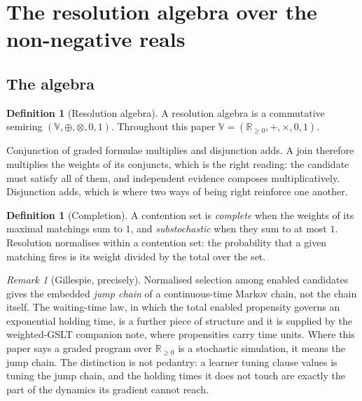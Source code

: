 \documentclass[11pt,a4paper]{article}
\theoremstyle{plain}
\theoremstyle{definition}
\newtheorem{definition}[theorem]{Definition}
\theoremstyle{remark}
\newtheorem{remark}[theorem]{Remark}
\newcommand{\V}{\mathbb{V}}
\newcommand{\Rnn}{\mathbb{R}_{\geq 0}}
\newcommand{\tensorv}{\otimes}
\newcommand{\sumv}{\oplus}
\begin{document}
\section{The resolution algebra over the non-negative reals}\label{sec:algebra}

\subsection{The algebra}

\begin{definition}[Resolution algebra]\label{def:alg}
A resolution algebra is a commutative semiring
$(\V, \sumv, \tensorv, 0, 1)$. Throughout this paper
$\V = (\Rnn, +, \times, 0, 1)$.
\end{definition}

Conjunction of graded formulae multiplies and disjunction adds. A join therefore
multiplies the weights of its conjuncts, which is the right reading: the
candidate must satisfy all of them, and independent evidence composes
multiplicatively. Disjunction adds, which is where two ways of being right
reinforce one another.

\begin{definition}[Completion]\label{def:completion}
A contention set is \emph{complete} when the weights of its maximal matchings sum
to $1$, and \emph{substochastic} when they sum to at most $1$. Resolution
normalises within a contention set: the probability that a given matching fires is
its weight divided by the total over the set.
\end{definition}

\begin{remark}[Gillespie, precisely]\label{rem:gillespie}
Normalised selection among enabled candidates gives the embedded \emph{jump
chain} of a continuous-time Markov chain, not the chain itself. The waiting-time
law, in which the total enabled propensity governs an exponential holding time, is
a further piece of structure and it is supplied by the weighted-GSLT companion
note, where propensities carry time units. Where this paper says a graded program
over $\Rnn$ is a stochastic simulation, it means the jump chain. The distinction
is not pedantry: a learner tuning clause values is tuning the jump chain, and the
holding times it does not touch are exactly the part of the dynamics its gradient
cannot reach.
\end{remark}
\end{document}
